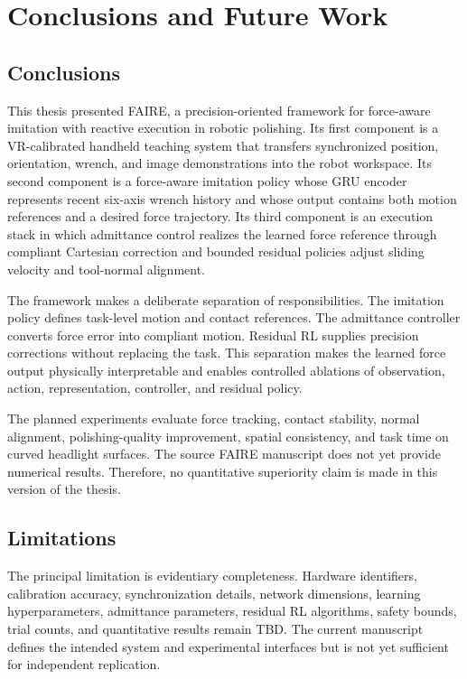 \chapter{Conclusions and Future Work}
\label{chap:conclusions}

\section{Conclusions}
This thesis presented FAIRE, a precision-oriented framework for force-aware imitation with reactive execution in robotic polishing. Its first component is a VR-calibrated handheld teaching system that transfers synchronized position, orientation, wrench, and image demonstrations into the robot workspace. Its second component is a force-aware imitation policy whose GRU encoder represents recent six-axis wrench history and whose output contains both motion references and a desired force trajectory. Its third component is an execution stack in which admittance control realizes the learned force reference through compliant Cartesian correction and bounded residual policies adjust sliding velocity and tool-normal alignment.

The framework makes a deliberate separation of responsibilities. The imitation policy defines task-level motion and contact references. The admittance controller converts force error into compliant motion. Residual RL supplies precision corrections without replacing the task. This separation makes the learned force output physically interpretable and enables controlled ablations of observation, action, representation, controller, and residual policy.

The planned experiments evaluate force tracking, contact stability, normal alignment, polishing-quality improvement, spatial consistency, and task time on curved headlight surfaces. The source FAIRE manuscript does not yet provide numerical results. Therefore, no quantitative superiority claim is made in this version of the thesis.

\section{Limitations}
The principal limitation is evidentiary completeness. Hardware identifiers, calibration accuracy, synchronization details, network dimensions, learning hyperparameters, admittance parameters, residual RL algorithms, safety bounds, trial counts, and quantitative results remain TBD. The current manuscript defines the intended system and experimental interfaces but is not yet sufficient for independent replication.

